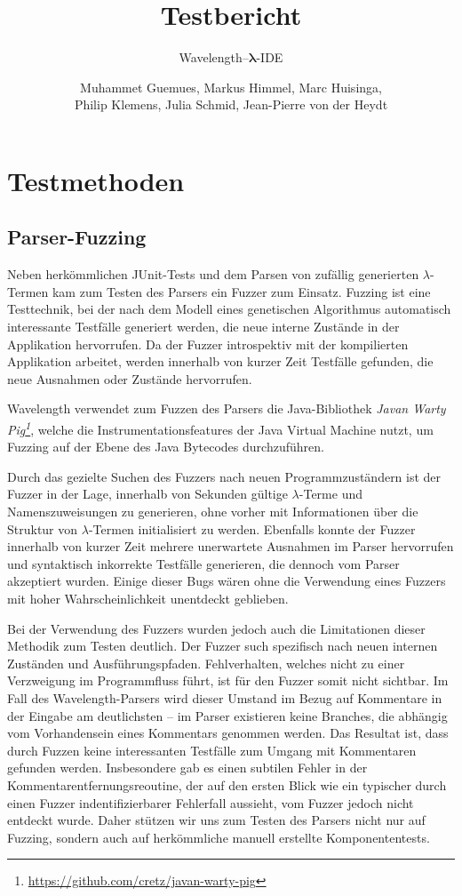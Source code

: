 \documentclass[parskip=full,11pt,openany]{scrreprt}
\title{Testbericht}
\subtitle{Wavelength--$\bm{\lambda}$-IDE}
\author{Muhammet Guemues, Markus Himmel, Marc Huisinga,\\Philip Klemens, Julia Schmid, Jean-Pierre von der Heydt}
\begin{document}
\maketitle
\newpage
\tableofcontents
\newpage

\chapter{Testmethoden}

\section{Parser-Fuzzing}
Neben herkömmlichen JUnit-Tests und dem Parsen von zufällig generierten
$\lambda$-Termen kam zum Testen des Parsers ein Fuzzer zum Einsatz. Fuzzing ist
eine Testtechnik, bei der nach dem Modell eines genetischen Algorithmus
automatisch interessante Testfälle generiert werden, die neue interne Zustände
in der Applikation hervorrufen. Da der Fuzzer introspektiv mit der kompilierten
Applikation arbeitet, werden innerhalb von kurzer Zeit Testfälle gefunden, die
neue Ausnahmen oder Zustände hervorrufen.

Wavelength verwendet zum Fuzzen des Parsers die Java-Bibliothek
\textit{Javan Warty Pig\footnote{\url{https://github.com/cretz/javan-warty-pig}}},
welche die Instrumentationsfeatures der Java Virtual Machine nutzt, um Fuzzing
auf der Ebene des Java Bytecodes durchzuführen.

Durch das gezielte Suchen des Fuzzers nach neuen Programmzuständern ist der
Fuzzer in der Lage, innerhalb von Sekunden gültige $\lambda$-Terme und
Namenszuweisungen zu generieren, ohne vorher mit Informationen über die Struktur
von $\lambda$-Termen initialisiert zu werden. Ebenfalls konnte der Fuzzer innerhalb
von kurzer Zeit mehrere unerwartete Ausnahmen im Parser hervorrufen und syntaktisch
inkorrekte Testfälle generieren, die dennoch vom Parser akzeptiert wurden. Einige
dieser Bugs wären ohne die Verwendung eines Fuzzers mit hoher Wahrscheinlichkeit
unentdeckt geblieben.

Bei der Verwendung des Fuzzers wurden jedoch auch die Limitationen dieser Methodik
zum Testen deutlich. Der Fuzzer such spezifisch nach neuen internen Zuständen und
Ausführungspfaden. Fehlverhalten, welches nicht zu einer Verzweigung im
Programmfluss führt, ist für den Fuzzer somit nicht sichtbar. Im Fall des
Wavelength-Parsers wird dieser Umstand im Bezug auf Kommentare in der Eingabe
am deutlichsten -- im Parser existieren keine Branches, die abhängig vom
Vorhandensein eines Kommentars genommen werden. Das Resultat ist, dass durch
Fuzzen keine interessanten Testfälle zum Umgang mit Kommentaren gefunden werden.
Insbesondere gab es einen subtilen Fehler in der Kommentarentfernungsreoutine,
der auf den ersten Blick wie ein typischer durch einen Fuzzer indentifizierbarer
Fehlerfall aussieht, vom Fuzzer jedoch nicht entdeckt wurde. Daher stützen wir
uns zum Testen des Parsers nicht nur auf Fuzzing, sondern auch auf herkömmliche
manuell erstellte Komponententests.
\end{document}
